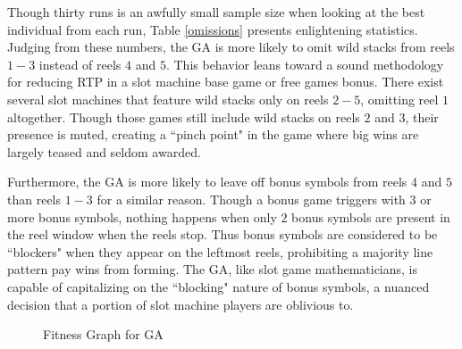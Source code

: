 \documentclass[conference]{IEEEtran}
\begin{document}
\par
Though thirty runs is an awfully small sample size when looking at the best individual from each run, Table \ref{omissions} presents enlightening statistics.
Judging from these numbers, the GA is more likely to omit wild stacks from reels $1-3$ instead of reels $4$ and $5$.
This behavior leans toward a sound methodology for reducing RTP in a slot machine base game or free games bonus.
There exist several slot machines that feature wild stacks only on reels $2-5$, omitting reel $1$ altogether.
Though those games still include wild stacks on reels $2$ and $3$, their presence is muted, creating a ``pinch point" in the game where big wins are largely teased and seldom awarded.
\par
Furthermore, the GA is more likely to leave off bonus symbols from reels $4$ and $5$ than reels $1-3$ for a similar reason.
Though a bonus game triggers with $3$ or more bonus symbols, nothing happens when only $2$ bonus symbols are present in the reel window when the reels stop.
Thus bonus symbols are considered to be ``blockers" when they appear on the leftmost reels, prohibiting a majority line pattern pay wins from forming.
The GA, like slot game mathematicians, is capable of capitalizing on the ``blocking" nature of bonus symbols, a nuanced decision that a portion of slot machine players are oblivious to.
\begin{figure}[H]
	\centering
{}\datatable
{}
\caption{Fitness Graph for GA}\label{fig:fitnessGA}
\end{figure}
\end{document}
